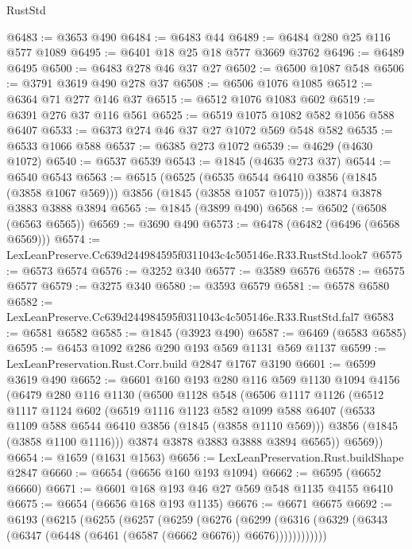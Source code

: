 \begin{lexlean}{RustStd}
\begin{coremodule}
@6483 := @3653 @490
@6484 := @6483 @44
@6489 := @6484 @280 @25 @116 @577 @1089
@6495 := @6401 @18 @25 @18 @577 @3669 @3762
@6496 := @6489 @6495
@6500 := @6483 @278 @46 @37 @27
@6502 := @6500 @1087 @548
@6506 := @3791 @3619 @490 @278 @37
@6508 := @6506 @1076 @1085
@6512 := @6364 @71 @277 @146 @37
@6515 := @6512 @1076 @1083 @602
@6519 := @6391 @276 @37 @116 @561
@6525 := @6519 @1075 @1082 @582 @1056 @588 @6407
@6533 := @6373 @274 @46 @37 @27 @1072 @569 @548 @582
@6535 := @6533 @1066 @588
@6537 := @6385 @273 @1072
@6539 := @4629 (@4630 @1072)
@6540 := @6537 @6539
@6543 := @1845 (@4635 @273 @37)
@6544 := @6540 @6543
@6563 := @6515
    (@6525 (@6535 @6544 @6410 @3856 (@1845 (@3858 @1067 @569))) @3856 (@1845 (@3858 @1057 @1075)))
    @3874
    @3878
    @3883
    @3888
    @3894
@6565 := @1845 (@3899 @490)
@6568 := @6502 (@6508 (@6563 @6565))
@6569 := @3690 @490
@6573 := @6478 (@6482 (@6496 (@6568 @6569)))
@6574 := LexLeanPreserve.Cc639d244984595f0311043c4c505146e.R33.RustStd.look7
@6575 := @6573 @6574
@6576 := @3252 @340
@6577 := @3589 @6576
@6578 := @6575 @6577
@6579 := @3275 @340
@6580 := @3593 @6579
@6581 := @6578 @6580
@6582 := LexLeanPreserve.Cc639d244984595f0311043c4c505146e.R33.RustStd.fal7
@6583 := @6581 @6582
@6585 := @1845 (@3923 @490)
@6587 := @6469 (@6583 @6585)
@6595 := @6453 @1092 @286 @290 @193 @569 @1131 @569 @1137
@6599 := LexLeanPreservation.Rust.Corr.build @2847 @1767 @3190
@6601 := @6599 @3619 @490
@6652 := @6601
    @160
    @193
    @280
    @116
    @569
    @1130
    @1094
    @4156
    (@6479
      @280
      @116
      @1130
      (@6500
        @1128
        @548
        (@6506
          @1117
          @1126
          (@6512
            @1117
            @1124
            @602
            (@6519
              @1116
              @1123
              @582
              @1099
              @588
              @6407
              (@6533 @1109 @588 @6544 @6410 @3856 (@1845 (@3858 @1110 @569)))
              @3856
              (@1845 (@3858 @1100 @1116)))
            @3874
            @3878
            @3883
            @3888
            @3894
            @6565))
        @6569))
@6654 := @1659 (@1631 @1563)
@6656 := LexLeanPreservation.Rust.buildShape @2847
@6660 := @6654 (@6656 @160 @193 @1094)
@6662 := @6595 (@6652 @6660)
@6671 := @6601 @168 @193 @46 @27 @569 @548 @1135 @4155 @6410
@6675 := @6654 (@6656 @168 @193 @1135)
@6676 := @6671 @6675
@6692 := @6193
    (@6215
      (@6255
        (@6257
          (@6259
            (@6276
              (@6299
                (@6316 (@6329 (@6343 (@6347 (@6448 (@6461 (@6587 (@6662 @6676)) @6676))))))))))))

\end{coremodule}
\end{lexlean}
